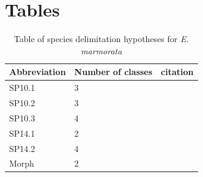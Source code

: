 \documentclass[11pt]{article}
\begin{document}
\newpage{}

\section*{Tables}
\renewcommand{\thetable}{\arabic{table}}
\setcounter{table}{0}

\begin{table}[h]
  \caption{Table of species delimitation hypotheses for \textit{E. marmorata}}
  \label{tab:hypotheses}
  \centering
  \begin{tabular}{l l l }
    \hline
      Abbreviation & Number of classes & citation \\
      \hline
      SP10.1 & 3 & \citet{Spinks2010} \\
      SP10.2 & 3 & \citet{Spinks2010} \\
      SP10.3 & 4 & \citet{Spinks2010} \\
      SP14.1 & 2 & \citet{Spinks2014} \\
      SP14.2 & 4 & \citet{Spinks2014} \\
      Morph & 2 & \citet{Spinks2010} \\
      \hline
  \end{tabular}
\end{table}

\begin{table}[h]
  \caption{Table of the supervised learning methods used in this analysis.}
  \label{tab:methods}
  \centering
\end{table}
\end{document}
